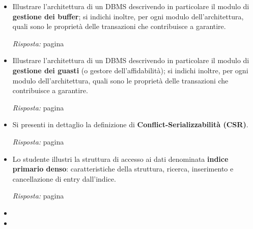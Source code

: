 \documentclass[a4paper]{article}
\begin{document}
	\begin{itemize}
		\item Illustrare l'architettura di un DBMS descrivendo in particolare il modulo di \textbf{gestione dei buffer}; si indichi inoltre, per ogni modulo dell'architettura, quali sono le proprietà delle transazioni che contribuisce a garantire.
		
		\emph{Risposta:} pagina \pageref{dom: gestione del buffer}
		
		\item Illustrare l'architettura di un DBMS descrivendo in particolare il modulo di \textbf{gestione dei guasti} (o gestore dell'affidabilità); si indichi inoltre, per ogni modulo dell'architettura, quali sono le proprietà delle transazioni che contribuisce a garantire.
		
		\emph{Risposta:} pagina \pageref{dom: gestione dei guasti}
		
		\item Si presenti in dettaglio la definizione di \textbf{Conflict-Serializzabilità (CSR)}.
		
		\emph{Risposta:} pagina \pageref{dom: CSR - Conflict-Serializzabilità}
		
		\item Lo studente illustri la struttura di accesso ai dati denominata \textbf{indice primario denso}: caratteristiche della struttura, ricerca, inserimento e cancellazione di entry dall'indice.
		
		\emph{Risposta:} pagina \pageref{dom: indice primario denso}
		
		\item 
		
		\item 
	\end{itemize}
\end{document}

